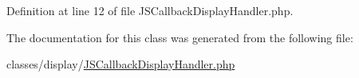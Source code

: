 Definition at line 12 of file J\+S\+Callback\+Display\+Handler.\+php.



The documentation for this class was generated from the following file\+:\begin{DoxyCompactItemize}
\item 
classes/display/\hyperlink{JSCallbackDisplayHandler_8php}{J\+S\+Callback\+Display\+Handler.\+php}\end{DoxyCompactItemize}
